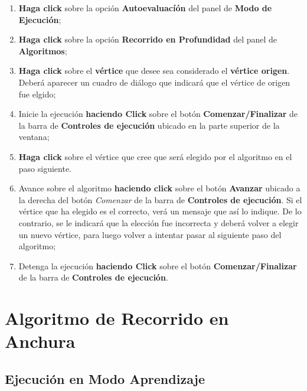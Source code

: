 \documentclass{book}
\begin{document}
\begin{enumerate}
	\itemsep=8pt \topsep=0pt \partopsep=0pt \parskip=0pt \parsep=0pt

	\item \textbf{Haga click} sobre la opción \textbf{Autoevaluacíón} del panel de \textbf{Modo de Ejecución};

	\item \textbf{Haga click} sobre la opción \textbf{Recorrido en Profundidad} del panel de \textbf{Algoritmos};

	\item \textbf{Haga click} sobre el \textbf{vértice} que desee sea considerado el \textbf{vértice origen}. Deberá aparecer un cuadro de diálogo que indicará que el vértice de origen fue elgido;

	\item Inicie la ejecución \textbf{haciendo Click} sobre el botón \textbf{Comenzar/Finalizar} de la barra de \textbf{Controles de ejecución} ubicado en la parte superior de la ventana;

	\item \textbf{Haga click} sobre el vértice que cree que será elegido por el algoritmo en el paso siguiente.

	\item Avance sobre el algoritmo \textbf{haciendo click} sobre el botón \textbf{Avanzar} ubicado a la derecha del botón \textit{Comenzar} de la barra de \textbf{Controles de ejecución}. Si el vértice que ha elegido es el correcto, verá un mensaje que así lo indique. De lo contrario, se le indicará que la elección fue incorrecta y deberá volver a elegir un nuevo vértice, para luego volver a intentar pasar al siguiente paso del algoritmo;

	\item Detenga la ejecución \textbf{haciendo Click} sobre el botón \textbf{Comenzar/Finalizar} de la barra de \textbf{Controles de ejecución}.

\end{enumerate}
\medskip



%
%
\chapter{Algoritmo de Recorrido en Anchura}


\section{Ejecución en Modo Aprendizaje}
\end{document}
